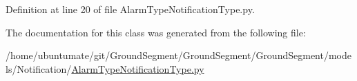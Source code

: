 Definition at line 20 of file Alarm\+Type\+Notification\+Type.\+py.



The documentation for this class was generated from the following file\+:\begin{DoxyCompactItemize}
\item 
/home/ubuntumate/git/\+Ground\+Segment/\+Ground\+Segment/\+Ground\+Segment/models/\+Notification/\hyperlink{_alarm_type_notification_type_8py}{Alarm\+Type\+Notification\+Type.\+py}\end{DoxyCompactItemize}
